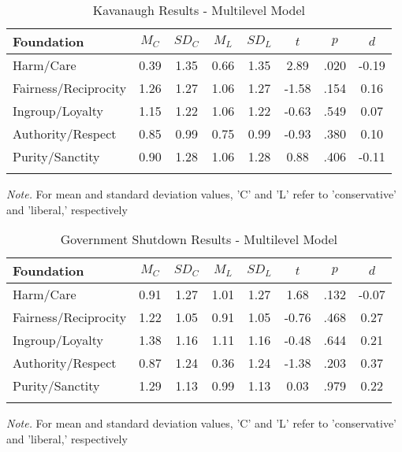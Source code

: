\documentclass[english,,man]{apa6}
\begin{document}
\begin{table}[tbp]
\begin{center}
\begin{threeparttable}
\caption{\label{tab:exp2-tablekav}Kavanaugh Results - Multilevel Model}
\begin{tabular}{lccccccc}
\toprule
Foundation & $M_C$ & $SD_C$ & $M_L$ & $SD_L$ & $t$ & $p$ & $d$\\
\midrule
Harm/Care & 0.39 & 1.35 & 0.66 & 1.35 & 2.89 & .020 & -0.19\\
Fairness/Reciprocity & 1.26 & 1.27 & 1.06 & 1.27 & -1.58 & .154 & 0.16\\
Ingroup/Loyalty & 1.15 & 1.22 & 1.06 & 1.22 & -0.63 & .549 & 0.07\\
Authority/Respect & 0.85 & 0.99 & 0.75 & 0.99 & -0.93 & .380 & 0.10\\
Purity/Sanctity & 0.90 & 1.28 & 1.06 & 1.28 & 0.88 & .406 & -0.11\\
\bottomrule
\addlinespace
\end{tabular}
\begin{tablenotes}[para]
\normalsize{\textit{Note.} For mean and standard deviation values, 'C' and 'L' refer to 'conservative' and 'liberal,' respectively}
\end{tablenotes}
\end{threeparttable}
\end{center}
\end{table}

\begin{table}[tbp]
\begin{center}
\begin{threeparttable}
\caption{\label{tab:exp2-tablegs}Government Shutdown Results - Multilevel Model}
\begin{tabular}{lccccccc}
\toprule
Foundation & $M_C$ & $SD_C$ & $M_L$ & $SD_L$ & $t$ & $p$ & $d$\\
\midrule
Harm/Care & 0.91 & 1.27 & 1.01 & 1.27 & 1.68 & .132 & -0.07\\
Fairness/Reciprocity & 1.22 & 1.05 & 0.91 & 1.05 & -0.76 & .468 & 0.27\\
Ingroup/Loyalty & 1.38 & 1.16 & 1.11 & 1.16 & -0.48 & .644 & 0.21\\
Authority/Respect & 0.87 & 1.24 & 0.36 & 1.24 & -1.38 & .203 & 0.37\\
Purity/Sanctity & 1.29 & 1.13 & 0.99 & 1.13 & 0.03 & .979 & 0.22\\
\bottomrule
\addlinespace
\end{tabular}
\begin{tablenotes}[para]
\normalsize{\textit{Note.} For mean and standard deviation values, 'C' and 'L' refer to 'conservative' and 'liberal,' respectively}
\end{tablenotes}
\end{threeparttable}
\end{center}
\end{table}
\end{document}
